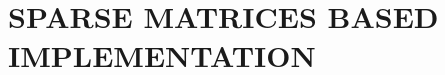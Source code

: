 \documentclass[a4paper]{amsart}
\begin{document}
\newpage

\part{SPARSE MATRICES BASED IMPLEMENTATION}
~ \\

\end{document}
